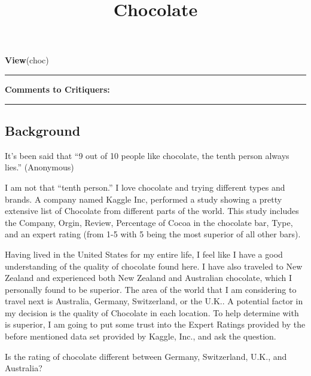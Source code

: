\documentclass[]{article}
\title{Chocolate}
\author{}
\date{}
\newenvironment{Shaded}{\begin{snugshade}}{\end{snugshade}}
\newcommand{\KeywordTok}[1]{\textcolor[rgb]{0.13,0.29,0.53}{\textbf{#1}}}
\newcommand{\NormalTok}[1]{#1}
\begin{document}
\maketitle

\begin{Shaded}
\begin{Highlighting}[]
\KeywordTok{View}\NormalTok{(choc)}
\end{Highlighting}
\end{Shaded}

\begin{center}\rule{0.5\linewidth}{\linethickness}\end{center}

\textbf{Comments to Critiquers:}

\begin{center}\rule{0.5\linewidth}{\linethickness}\end{center}

\hypertarget{background}{%
\subsection{Background}\label{background}}

It's been said that ``9 out of 10 people like chocolate, the tenth
person always lies.'' (Anonymous)

I am not that ``tenth person.'' I love chocolate and trying different
types and brands. A company named Kaggle Inc, performed a study showing
a pretty extensive list of Chocolate from different parts of the world.
This study includes the Company, Orgin, Review, Percentage of Cocoa in
the chocolate bar, Type, and an expert rating (from 1-5 with 5 being the
most superior of all other bars).

Having lived in the United States for my entire life, I feel like I have
a good understanding of the quality of chocolate found here. I have also
traveled to New Zealand and experienced both New Zealand and Australian
chocolate, which I personally found to be superior. The area of the
world that I am considering to travel next is Australia, Germany,
Switzerland, or the U.K.. A potential factor in my decision is the
quality of Chocolate in each location. To help determine with is
superior, I am going to put some trust into the Expert Ratings provided
by the before mentioned data set provided by Kaggle, Inc., and ask the
question.

Is the rating of chocolate different between Germany, Switzerland, U.K.,
and Australia?
\end{document}
